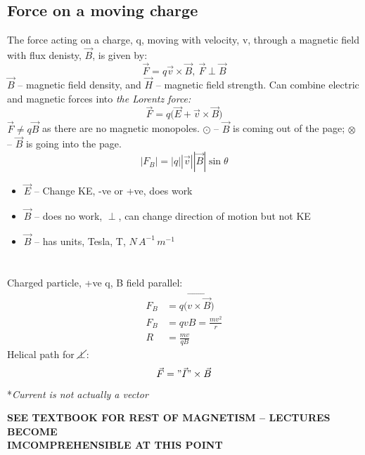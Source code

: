 \documentclass[a4paper, 11pt, normalem]{report}
\begin{document}
\section{Force on a moving charge}
The force acting on a charge, q, moving with velocity, v, through a magnetic field with flux denisty, $\vec{B}$, is given by:
\begin{equation}
    \vec{F} = q\vec{v} \times \vec{B}, ~ \vec{F} \perp \vec{B}
\end{equation}
$\vec{B}$ -- magnetic field density, and $\vec{H}$ -- magnetic field strength.
Can combine electric and magnetic forces into \emph{the Lorentz force:}
\begin{equation}
    \vec{F} = q \big( \vec{E} + \vec{v} \times \vec{B} \big)
\end{equation}
$\vec{F} \neq q\vec{B}$ as there are no magnetic monopoles.
$\odot$ -- $\vec{B}$ is coming out of the page; $\otimes$ -- $\vec{B}$ is going into the page.
\begin{equation}
    |F_{B}| = |q||\vec{v}||\vec{B}|\sin\theta
\end{equation}
\begin{itemize}
    \item $\vec{E}$ -- Change KE, -ve or +ve, does work
    \item $\vec{B}$ -- does no work, $\perp$, can change direction of motion but not KE
    \item $\vec{B}$ -- has units, Tesla, T, $N\,A^{-1}\,m^{-1}$
\end{itemize}

\chapter{}
Charged particle, +ve q, B field parallel:
\begin{align}
    F_{B} &= q\big(\vec{v \times \vec{B}} \big)\\
    F_{B} &= qvB = \frac{mv^{2}}{r} \\
    R &= \frac{mv}{qB}
\end{align}
Helical path for $\cancel{\perp}$:
\begin{equation}
    \vec{F} = "\vec{I}" \times \vec{B}
\end{equation}
*\textit{Current is not actually a vector}

\textbf{SEE TEXTBOOK FOR REST OF MAGNETISM -- LECTURES BECOME \\ IMCOMPREHENSIBLE AT THIS POINT}
\end{document}
